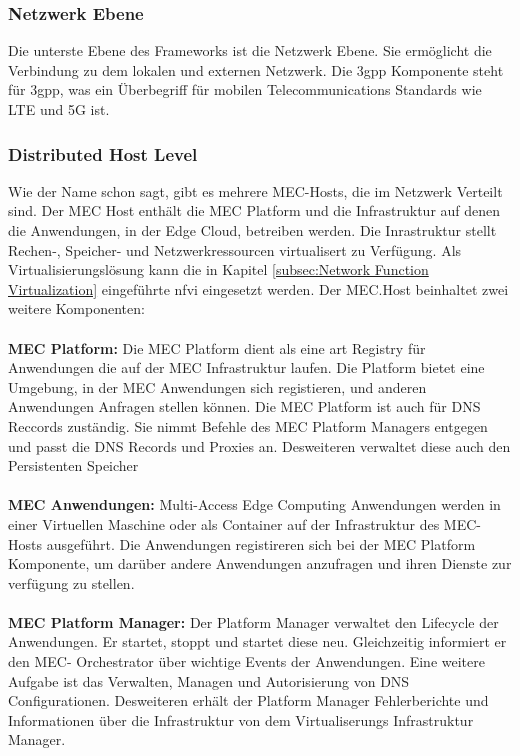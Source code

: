 \documentclass[runningheads]{llncs}
\numberwithin{figure}{section}
\begin{document}
\subsubsection{Netzwerk Ebene}
Die unterste Ebene des Frameworks ist die Netzwerk Ebene. Sie ermöglicht die Verbindung zu dem lokalen und 
externen Netzwerk. Die \acrshort{3gpp} Komponente steht für \acrlong{3gpp}, was ein Überbegriff für mobilen
Telecommunications Standards wie LTE und 5G ist. 
\subsubsection{Distributed Host Level}
Wie der Name schon sagt, gibt es mehrere MEC-Hosts, die im Netzwerk Verteilt sind.
Der MEC Host enthält die MEC Platform und die Infrastruktur auf denen die Anwendungen, in der Edge Cloud, betreiben werden.
Die Inrastruktur stellt Rechen-, Speicher- und Netzwerkressourcen virtualisert zu Verfügung. Als Virtualisierungslösung kann
die in Kapitel \ref{subsec:Network Function Virtualization} eingeführte \acrlong{nfvi}
eingesetzt werden. Der MEC.Host beinhaltet zwei weitere Komponenten:
\\
\\
\textbf{MEC Platform:} Die MEC Platform dient als eine art Registry für  
Anwendungen die auf der MEC Infrastruktur laufen. Die Platform bietet eine Umgebung, in der MEC Anwendungen sich registieren,
und anderen Anwendungen Anfragen stellen können. Die MEC Platform ist auch für DNS Reccords zuständig. Sie nimmt Befehle
des MEC Platform Managers entgegen und passt die DNS Records und Proxies an. Desweiteren verwaltet diese auch den Persistenten Speicher
\\
\\
\textbf{MEC Anwendungen:} Multi-Access Edge Computing Anwendungen werden in einer Virtuellen Maschine oder als
Container auf der Infrastruktur des MEC-Hosts ausgeführt. Die Anwendungen registireren sich bei der MEC Platform
Komponente, um darüber andere Anwendungen anzufragen und ihren Dienste zur verfügung zu stellen.
\\
\\
\textbf{MEC Platform Manager:} Der Platform Manager verwaltet den Lifecycle der Anwendungen. Er startet, stoppt und startet diese neu.
Gleichzeitig informiert er den MEC- Orchestrator über wichtige Events der Anwendungen. 
Eine weitere Aufgabe ist das Verwalten, Managen und Autorisierung von DNS Configurationen.
Desweiteren erhält der Platform Manager Fehlerberichte und Informationen über die Infrastruktur von dem Virtualiserungs Infrastruktur Manager.
\end{document}
